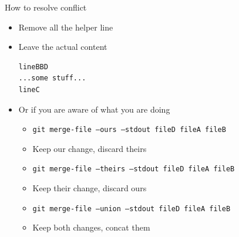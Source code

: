 \documentclass[aspectratio=169]{beamer}
\newcommand{\T}[1]{\texttt{#1}}
\begin{document}
\begin{frame}[fragile]{How to resolve conflict}
  \begin{itemize}
    \item Remove all the helper line
    \item Leave the actual content\begin{verbatim}
lineBBD
...some stuff...
lineC
\end{verbatim}
    \item Or if you are aware of what you are doing\begin{itemize}
      \item \T{git merge-file --ours --stdout fileD fileA fileB}
      \item Keep our change, discard theirs
      \item \T{git merge-file --theirs --stdout fileD fileA fileB}
      \item Keep their change, discard ours
      \item \T{git merge-file --union --stdout fileD fileA fileB}
      \item Keep both changes, concat them
    \end{itemize}
  \end{itemize}
\end{frame}
\end{document}
